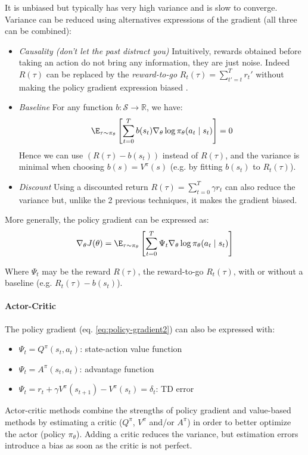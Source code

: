 It is unbiased but typically has very high variance and is slow to converge. Variance can be reduced using alternatives expressions of the gradient (all three can be combined):
\begin{itemize}
    \item \emph{Causality (don't let the past distract you)}
    Intuitively, rewards obtained before taking an action do not bring any information, they are just noise. Indeed $R(\tau)$ can be replaced by the \emph{reward-to-go} $R_t(\tau) = \sum_{t'=t}^T r_t'$ without making the policy gradient expression biased \demo.
    \item \emph{Baseline}
    For any function $b:\mathcal{S} \rightarrow \mathbb{R}$, we have:
    \[
        \E_{\tau \sim \pi_\theta} \left[\sum_{t=0}^T b(s_t) \nabla_\theta \log \pi_\theta(a_t \mid  s_t) \right] = 0
    \]
    Hence \demo we can use $(R(\tau) - b(s_t))$ instead of $R(\tau)$, and the variance is minimal when choosing $b(s) = V^\pi(s)$  (e.g. by fitting $b(s_t)$ to  $R_t(\tau)$).
    \item \emph{Discount}
    Using a discounted return $R(\tau) = \sum_{t=0}^T \gamma r_t$ can also reduce the variance but, unlike the 2 previous techniques, it makes the gradient biased. 
\end{itemize}

More generally, the policy gradient can be expressed as:
\begin{equation}
    \nabla_\theta J(\theta) 
    = \E_{\tau \sim \pi_\theta} \left[\sum_{t=0}^T \Psi_t \nabla_\theta \log \pi_\theta(a_t \mid  s_t) \right]
    \label{eq:policy-gradient2}
\end{equation}

Where $\Psi_t$ may be the reward $R(\tau)$, the reward-to-go $R_t(\tau)$, with or without a baseline (e.g. $R_t(\tau) - b(s_t)$).

\paragraph{Actor-Critic}
The policy gradient (eq. \ref{eq:policy-gradient2}) can also be expressed \demo with:
\begin{itemize}
    \item $\Psi_t = Q^\pi(s_t,a_t)$: state-action value function
    \item $\Psi_t = A^\pi(s_t,a_t)$: advantage function
    \item $\Psi_t = r_t + \gamma V^\pi(s_{t+1}) - V^\pi(s_t) = \delta_t$: TD error
\end{itemize}
Actor-critic methods combine the strengths of policy gradient and value-based methods by estimating a critic ($Q^\pi$, $V^\pi$ and/or $A^\pi$) in order to better optimize the actor (policy $\pi_\theta$). Adding a critic reduces the variance, but estimation errors introduce a bias as soon as the critic is not perfect.

